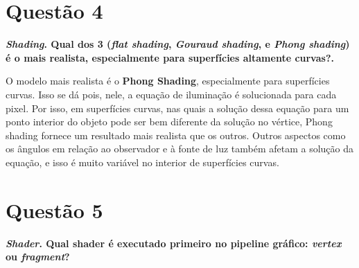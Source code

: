 \documentclass[12pt]{exam}
\begin{document}
\begin{table}[tbh]
    \centering
\end{table}

\section*{Questão 4}
{\bfseries \textit{Shading}. Qual dos 3 (\textit{flat shading}, \textit{Gouraud shading}, e \textit{Phong shading}) é o mais realista, especialmente para superfícies altamente curvas?.}

O modelo mais realista é o \textbf{Phong Shading}, especialmente para superfícies curvas. Isso se dá pois, nele, a equação de iluminação é solucionada para cada pixel. Por isso, em superfícies curvas, nas quais a solução dessa equação para um ponto interior do objeto pode ser bem diferente da solução no vértice, Phong shading fornece um resultado mais realista que os outros. Outros aspectos como os ângulos em relação ao observador e à fonte de luz também afetam a solução da equação, e isso é muito variável no interior de superfícies curvas.

\section*{Questão 5}
{\bfseries \textit{Shader}. Qual shader é executado primeiro no pipeline gráfico: \textit{vertex} ou \textit{fragment}?}
\end{document}
